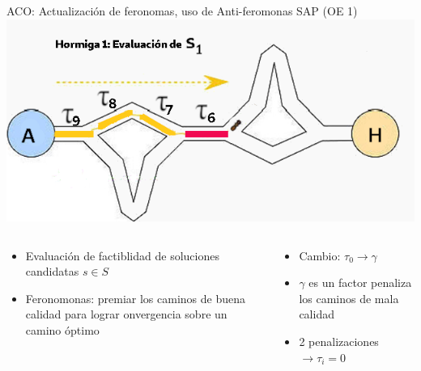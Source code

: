 \begin{frame}{ACO: Actualizaci\'on de feronomas, uso de Anti-feromonas SAP (OE 1)}
    \centering
    \includegraphics[scale=0.4]{Pictures/ACO-ant-ferom-penalize.png}
    \begin{columns}
        \begin{column}{0.5\textwidth}
            \begin{itemize}
            \small
                \item Evaluaci\'on de factiblidad de soluciones candidatas $s \in S$
                \item Feronomonas: premiar los caminos de buena calidad para lograr onvergencia sobre un camino \'optimo
                
            \end{itemize}
        \end{column}
        \begin{column}{0.5\textwidth}
            \begin{itemize}
            \small
                \item Cambio: $\tau_0 \longrightarrow \gamma$
                \item $\gamma$ es un factor penaliza los caminos de mala calidad
                \item 2 penalizaciones $\longrightarrow \tau_i = 0$ 
            \end{itemize}
        \end{column}
    \end{columns}
    
\end{frame}

